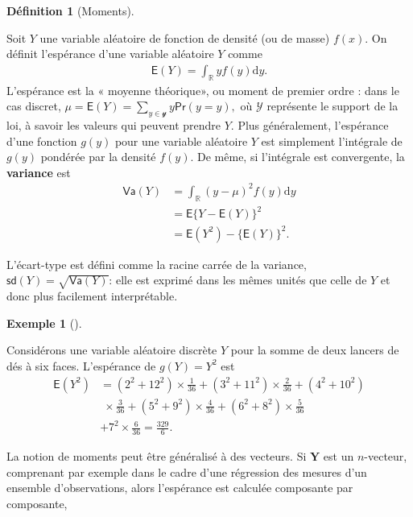 \documentclass[
  11pt,
  letterpaper,
]{scrbook}
\theoremstyle{plain}
\theoremstyle{plain}
\theoremstyle{definition}
\newtheorem{example}{Exemple}[chapter]
\theoremstyle{definition}
\newtheorem{definition}{Définition}[chapter]
\theoremstyle{remark}
\begin{document}
\begin{definition}[Moments]\protect\hypertarget{def-moments}{}\label{def-moments}

Soit \(Y\) une variable aléatoire de fonction de densité (ou de masse)
\(f(x).\) On définit l'espérance d'une variable aléatoire \(Y\) comme
\begin{align*}
\mathsf{E}(Y)=\int_{\mathbb{R}} y f(y) \mathrm{d} y.
\end{align*} L'espérance est la « moyenne théorique», ou moment de
premier ordre : dans le cas discret,
\(\mu = \mathsf{E}(Y)=\sum_{y \in \mathcal{y}} y \mathsf{Pr}(y=y),\) où
\(\mathcal{Y}\) représente le support de la loi, à savoir les valeurs
qui peuvent prendre \(Y.\) Plus généralement, l'espérance d'une fonction
\(g(y)\) pour une variable aléatoire \(Y\) est simplement l'intégrale de
\(g(y)\) pondérée par la densité \(f(y).\) De même, si l'intégrale est
convergente, la \textbf{variance} est \begin{align*}
\mathsf{Va}(Y)&=\int_{\mathbb{R}} (y-\mu)^2 f(y) \mathrm{d} y \\&=\mathsf{E}\{Y-\mathsf{E}(Y)\}^2 \\&= \mathsf{E}(Y^2) - \{\mathsf{E}(Y)\}^2.
\end{align*}

L'écart-type est défini comme la racine carrée de la variance,
\(\mathsf{sd}(Y)=\sqrt{\mathsf{Va}(Y)}\): elle est exprimé dans les
mêmes unités que celle de \(Y\) et donc plus facilement interprétable.

\begin{example}[]\protect\hypertarget{exm-moments-des}{}\label{exm-moments-des}

Considérons une variable aléatoire discrète \(Y\) pour la somme de deux
lancers de dés à six faces. L'espérance de \(g(Y)=Y^2\) est
\begin{align*}
\mathsf{E}(Y^2) &= (2^2 + 12^2) \times \frac{1}{36} + (3^2 + 11^2) \times  \frac{2}{36} + (4^2 + 10^2) \\&\;\times  \frac{3}{36} + (5^2 +9^2) \times  \frac{4}{36} + (6^2 + 8^2) \times  \frac{5}{36} \\& + 7^2 \times  \frac{6}{36}= \frac{329}{6}.
\end{align*}

\end{example}

La notion de moments peut être généralisé à des vecteurs. Si
\(\boldsymbol{Y}\) est un \(n\)-vecteur, comprenant par exemple dans le
cadre d'une régression des mesures d'un ensemble d'observations, alors
l'espérance est calculée composante par composante,


\end{definition}
\end{document}
